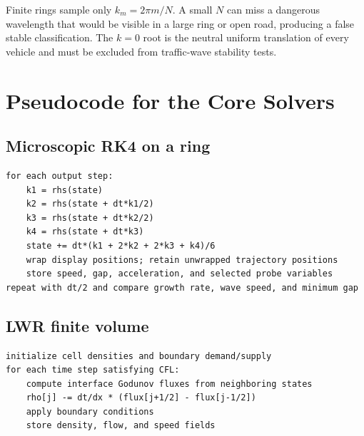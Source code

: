 \documentclass[11pt,a4paper,openany]{book}
\numberwithin{equation}{chapter}
\numberwithin{figure}{chapter}
\numberwithin{table}{chapter}
\begin{document}
Finite rings sample only $k_m=2\pi m/N$. A small $N$ can miss a dangerous wavelength that would be visible in a large ring or open road, producing a false stable classification. The $k=0$ root is the neutral uniform translation of every vehicle and must be excluded from traffic-wave stability tests.

\chapter{Pseudocode for the Core Solvers}
\section*{Microscopic RK4 on a ring}
\begin{verbatim}
for each output step:
    k1 = rhs(state)
    k2 = rhs(state + dt*k1/2)
    k3 = rhs(state + dt*k2/2)
    k4 = rhs(state + dt*k3)
    state += dt*(k1 + 2*k2 + 2*k3 + k4)/6
    wrap display positions; retain unwrapped trajectory positions
    store speed, gap, acceleration, and selected probe variables
repeat with dt/2 and compare growth rate, wave speed, and minimum gap
\end{verbatim}

\section*{LWR finite volume}
\begin{verbatim}
initialize cell densities and boundary demand/supply
for each time step satisfying CFL:
    compute interface Godunov fluxes from neighboring states
    rho[j] -= dt/dx * (flux[j+1/2] - flux[j-1/2])
    apply boundary conditions
    store density, flow, and speed fields
\end{verbatim}
\end{document}
